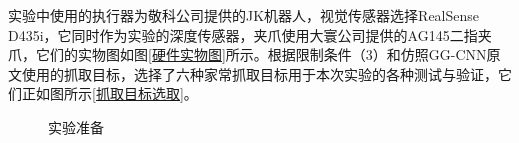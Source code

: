 \documentclass[fontset=fandol,type=bachelor,campus=harbin,bsmainpagenumberline=true]{hithesisbook}
\begin{document}
实验中使用的执行器为敬科公司提供的JK机器人，视觉传感器选择RealSense D435i，它同时作为实验的深度传感器，夹爪使用大寰公司提供的AG145二指夹爪，它们的实物图如图\ref{硬件实物图}所示。根据限制条件（3）和仿照GG-CNN原文使用的抓取目标，选择了六种家常抓取目标用于本次实验的各种测试与验证，它们正如图所示\ref{抓取目标选取}。
\begin{figure}[h]
	\centering
	\caption{实验准备}
	\label{实验准备}
\end{figure}
\end{document}
